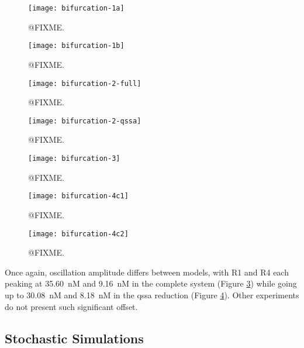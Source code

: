     \begin{figure}[!htbp]
      \centering
      \texttt{[image: bifurcation-1a]}
      \caption{@FIXME.}
      \label{fig.bifurcation-1a}
    \end{figure}

    \begin{figure}[!htbp]
      \centering
      \texttt{[image: bifurcation-1b]}
      \caption{@FIXME.}
      \label{fig.bifurcation-1b}
    \end{figure}

    \begin{figure}[!htbp]
      \centering
      \texttt{[image: bifurcation-2-full]}
      \caption{@FIXME.}
      \label{fig.bifurcation-2-full}
    \end{figure}

    \begin{figure}[!htbp]
      \centering
      \texttt{[image: bifurcation-2-qssa]}
      \caption{@FIXME.}
      \label{fig.bifurcation-2-qssa}
    \end{figure}

    \begin{figure}[!htbp]
      \centering
      \texttt{[image: bifurcation-3]}
      \caption{@FIXME.}
      \label{fig.bifurcation-3}
    \end{figure}

    \begin{figure}[!htbp]
      \centering
      \texttt{[image: bifurcation-4c1]}
      \caption{@FIXME.}
      \label{fig.bifurcation-4c1}
    \end{figure}

    \begin{figure}[!htbp]
      \centering
      \texttt{[image: bifurcation-4c2]}
      \caption{@FIXME.}
      \label{fig.bifurcation-4c2}
    \end{figure}

    Once again, oscillation amplitude differs between models, with R1 and R4 each peaking at \SI{35.60}{\nano M} and \SI{9.16}{\nano M} in the complete system (Figure \ref{fig.bifurcation-2-full}) while going up to \SI{30.08}{\nano M} and \SI{8.18}{\nano M} in the \ac{qssa} reduction (Figure \ref{fig.bifurcation-2-qssa}).
    Other experiments do not present such significant offset.


  \subsection{Stochastic Simulations}

